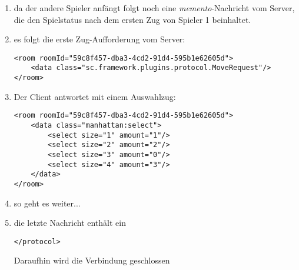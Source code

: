 \documentclass[12pt,a4paper, german, oneside]{scrartcl}
\begin{document}
\begin{enumerate}
\begin{verbatim}
\end{verbatim}
\item da der andere Spieler anfängt folgt noch eine \textit{memento}-Nachricht vom Server, die den Spielstatus nach dem ersten Zug von Spieler 1 beinhaltet.
\item es folgt die erste Zug-Aufforderung vom Server: \begin{verbatim}
<room roomId="59c8f457-dba3-4cd2-91d4-595b1e62605d">
    <data class="sc.framework.plugins.protocol.MoveRequest"/>
</room>
\end{verbatim}
\item Der Client antwortet mit einem Auswahlzug: \begin{verbatim}
<room roomId="59c8f457-dba3-4cd2-91d4-595b1e62605d">
    <data class="manhattan:select">
        <select size="1" amount="1"/>
        <select size="2" amount="2"/>
        <select size="3" amount="0"/>
        <select size="4" amount="3"/>
    </data>
</room>
\end{verbatim}
\item so geht es weiter...
\item die letzte Nachricht enthält ein \begin{verbatim}
</protocol>
\end{verbatim}
Daraufhin wird die Verbindung geschlossen
\end{enumerate}
\end{document}
